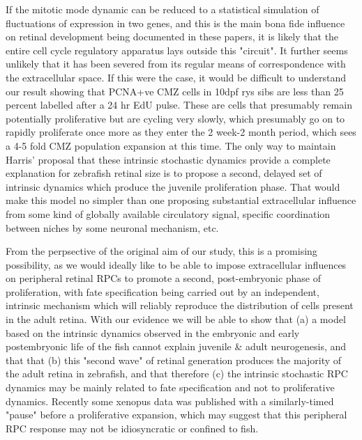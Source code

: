 If the mitotic mode dynamic can be reduced to a statistical simulation of fluctuations of expression in two genes, and this is the main bona fide influence on retinal development being documented in these papers, it is likely that the entire cell cycle regulatory apparatus lays outside this "circuit". It further seems unlikely that it has been severed from its regular means of correspondence with the extracellular space. If this were the case, it would be difficult to understand our result showing that PCNA+ve CMZ cells in 10dpf rys sibs are less than 25 percent labelled after a 24 hr EdU pulse. These are cells that presumably remain potentially proliferative but are cycling very slowly, which presumably go on to rapidly proliferate once more as they enter the 2 week-2 month period, which sees a 4-5 fold CMZ population expansion at this time. The only way to maintain Harris' proposal that these intrinsic stochastic dynamics provide a complete explanation for zebrafish retinal size is to propose a second, delayed set of intrinsic dynamics which produce the juvenile proliferation phase. That would make this model no simpler than one proposing substantial extracellular influence from some kind of globally available circulatory signal, specific coordination between niches by some neuronal mechanism, etc.

From the perpsective of the original aim of our study, this is a promising possibility, as we would ideally like to be able to impose extracellular influences on peripheral retinal RPCs to promote a second, post-embryonic phase of proliferation, with fate specification being carried out by an independent, intrinsic mechanism which will reliably reproduce the distribution of cells present in the adult retina. With our evidence we will be able to show that (a) a model based on the intrinsic dynamics observed in the embryonic and early postembryonic life of the fish cannot explain juvenile \& adult neurogenesis, and that that (b) this "second wave" of retinal generation produces the majority of the adult retina in zebrafish, and that therefore (c) the intrinsic stochastic RPC dynamics may be mainly related to fate specification and not to proliferative dynamics. Recently some xenopus data was published with a similarly-timed "pause" \cite{} before a proliferative expansion, which may suggest that this peripheral RPC response may not be idiosyncratic or confined to fish.

